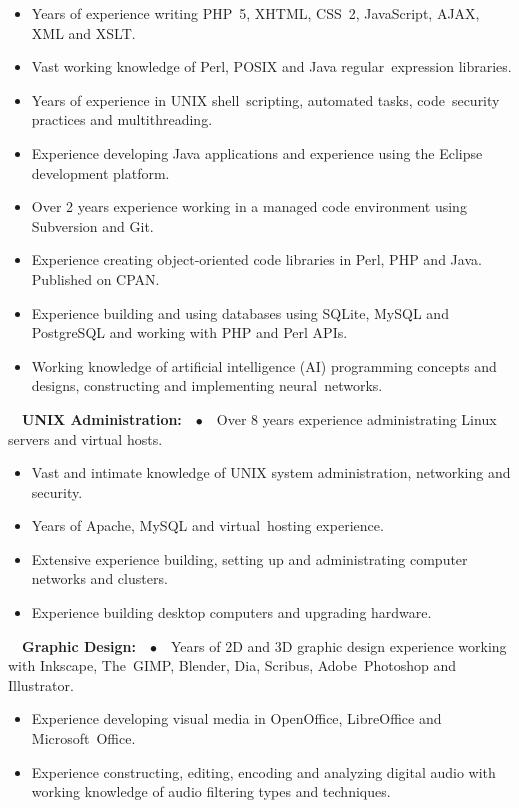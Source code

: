 \documentclass[letterpaper]{article}
\newcommand\textstyleStrongEmphasis[1]{\textbf{#1}}
\newcommand\textstyleBulletSymbols[1]{\textrm{#1}}
\newcommand\liststyleLi{%
\renewcommand\labelitemi{${\bullet}$}
\renewcommand\labelitemii{${\circ}$}
\renewcommand\labelitemiii{${\blacksquare}$}
\renewcommand\labelitemiv{${\bullet}$}
}
\begin{document}
\liststyleLi
\begin{itemize}
\item Years of experience writing PHP~5, XHTML, CSS~2, JavaScript, AJAX, XML and XSLT.
\item Vast working knowledge of Perl, POSIX and Java regular~expression libraries.
\item Years of experience in UNIX shell~scripting, automated tasks, code~security practices and multithreading.
\item Experience developing Java applications and experience using the Eclipse development platform.
\item Over 2 years experience working in a managed code environment using Subversion and Git.
\item Experience creating object\nobreakdash-oriented code libraries in Perl, PHP and Java. Published on CPAN.
\item Experience building and using databases using SQLite, MySQL and PostgreSQL and working with PHP and Perl APIs.
\item Working knowledge of artificial intelligence (AI) programming concepts and designs, constructing and implementing neural~networks.
\end{itemize}
\ \ \textstyleStrongEmphasis{UNIX Administration:}\ \ \textstyleBulletSymbols{${\bullet}$}\ \ Over 8 years experience administrating Linux servers and virtual hosts.

\liststyleLi
\begin{itemize}
\item Vast and intimate knowledge of UNIX system administration, networking and security.
\item Years of Apache, MySQL and virtual~hosting experience.
\item Extensive experience building, setting up and administrating computer networks and clusters.
\item Experience building desktop computers and upgrading hardware.
\end{itemize}
\ \ \textstyleStrongEmphasis{Graphic Design:}\ \ \textstyleBulletSymbols{${\bullet}$}\ \ Years of 2D and 3D graphic design experience working with Inkscape, The~GIMP, Blender, Dia, Scribus, Adobe~Photoshop and Illustrator.

\liststyleLi
\begin{itemize}
\item Experience developing visual media in OpenOffice, LibreOffice and Microsoft~Office.
\item Experience constructing, editing, encoding and analyzing digital audio with working knowledge of audio filtering types and techniques.
\end{itemize}
\end{document}
